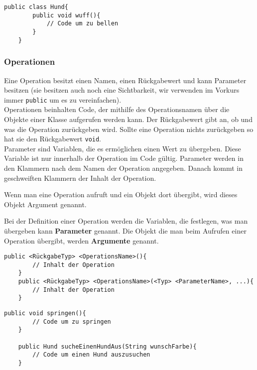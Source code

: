 \begin{lstlisting}[title=\textbf{Klassen Beispiel}]
	public class Hund{
		public void wuff(){
			// Code um zu bellen
		}
	}
\end{lstlisting}
\begin{Infobox}
	\subsubsection*{Operationen}
	Eine Operation besitzt einen Namen, einen Rückgabewert und kann Parameter besitzen (sie besitzen auch noch eine Sichtbarkeit, wir verwenden im Vorkurs immer \lstinline{public} um es zu vereinfachen).\\
	Operationen beinhalten Code, der mithilfe des Operationsnamen über die Objekte einer Klasse aufgerufen werden kann.
	Der Rückgabewert gibt an, ob und was die Operation zurückgeben wird.
	Sollte eine Operation nichts zurückgeben so hat sie den Rückgabewert \lstinline{void}.\\
	Parameter sind Variablen, die es ermöglichen einen Wert zu übergeben. Diese Variable ist nur innerhalb der Operation im Code gültig.
	Parameter werden in den Klammern nach dem Namen der Operation angegeben.
	Danach kommt in geschweiften Klammern der Inhalt der Operation.
	
	Wenn man eine Operation aufruft und ein Objekt dort übergibt, wird dieses Objekt Argument genannt.
\end{Infobox}
\vspace{5mm}

\begin{Infobox}
	Bei der Definition einer Operation werden die Variablen, die festlegen, was man übergeben kann \textbf{Parameter} genannt. Die Objekt die man beim Aufrufen einer Operation übergibt, werden \textbf{Argumente} genannt. 
\end{Infobox}

\begin{lstlisting}[title=\textbf{Operations Syntax}]
	public <RückgabeTyp> <OperationsName>(){
		// Inhalt der Operation
	}
	public <RückgabeTyp> <OperationsName>(<Typ> <ParameterName>, ...){
		// Inhalt der Operation
	}
\end{lstlisting}

\begin{lstlisting}[title=\textbf{Operations Beispiel}]
	public void springen(){
		// Code um zu springen
	}
	
	public Hund sucheEinenHundAus(String wunschFarbe){
		// Code um einen Hund auszusuchen
	}
\end{lstlisting}

